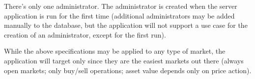 There's only one administrator. The administrator is created when the server
application is run for the first time (additional administrators may be added
manually to the database, but the application will not support a use case for
the creation of an administrator, except for the first run).

While the above specifications may be applied to any type of market, the
application will target only  since they are
the easiest markets out there (always open markets; only buy/sell operations;
asset value depends only on price action).
